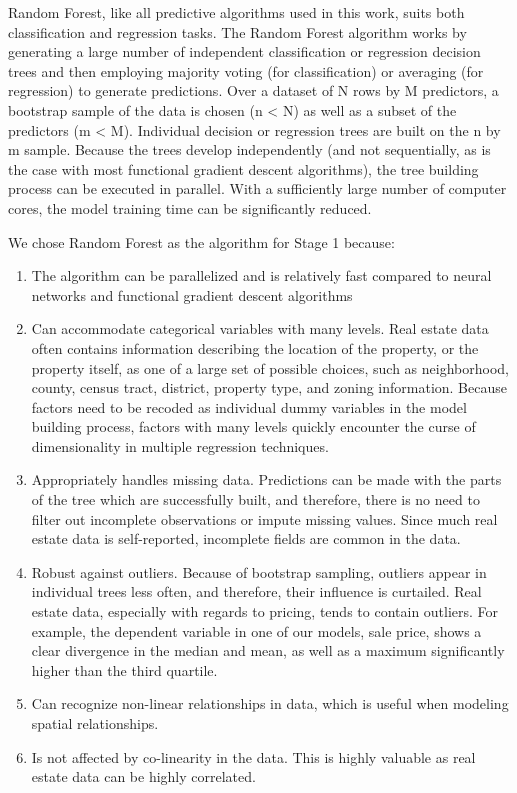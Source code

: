 \documentclass[12pt,]{article}
\providecommand{\tightlist}{%
  \setlength{\itemsep}{0pt}\setlength{\parskip}{0pt}}
\begin{document}
Random Forest, like all predictive algorithms used in this work, suits
both classification and regression tasks. The Random Forest algorithm
works by generating a large number of independent classification or
regression decision trees and then employing majority voting (for
classification) or averaging (for regression) to generate predictions.
Over a dataset of N rows by M predictors, a bootstrap sample of the data
is chosen (n \textless{} N) as well as a subset of the predictors (m
\textless{} M). Individual decision or regression trees are built on the
n by m sample. Because the trees develop independently (and not
sequentially, as is the case with most functional gradient descent
algorithms), the tree building process can be executed in parallel. With
a sufficiently large number of computer cores, the model training time
can be significantly reduced.

We chose Random Forest as the algorithm for Stage 1 because:

\begin{enumerate}
\def\labelenumi{\arabic{enumi})}
\tightlist
\item
  The algorithm can be parallelized and is relatively fast compared to
  neural networks and functional gradient descent algorithms
\item
  Can accommodate categorical variables with many levels. Real estate
  data often contains information describing the location of the
  property, or the property itself, as one of a large set of possible
  choices, such as neighborhood, county, census tract, district,
  property type, and zoning information. Because factors need to be
  recoded as individual dummy variables in the model building process,
  factors with many levels quickly encounter the curse of dimensionality
  in multiple regression techniques.
\item
  Appropriately handles missing data. Predictions can be made with the
  parts of the tree which are successfully built, and therefore, there
  is no need to filter out incomplete observations or impute missing
  values. Since much real estate data is self-reported, incomplete
  fields are common in the data.
\item
  Robust against outliers. Because of bootstrap sampling, outliers
  appear in individual trees less often, and therefore, their influence
  is curtailed. Real estate data, especially with regards to pricing,
  tends to contain outliers. For example, the dependent variable in one
  of our models, sale price, shows a clear divergence in the median and
  mean, as well as a maximum significantly higher than the third
  quartile.
\item
  Can recognize non-linear relationships in data, which is useful when
  modeling spatial relationships.
\item
  Is not affected by co-linearity in the data. This is highly valuable
  as real estate data can be highly correlated.
\end{enumerate}
\end{document}
